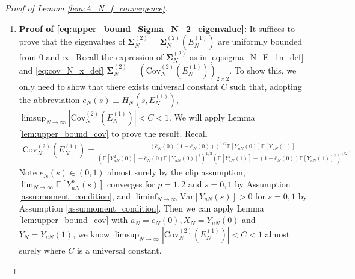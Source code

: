 \documentclass[12pt]{article}
\newcommand{\E}{\mathbb E}								%
\begin{document}
\begin{proof}[Proof of Lemma \ref{lem:A_N_f_convergence}]
	\begin{enumerate}
		\item \textbf{Proof of \eqref{eq:upper_bound_Sigma_N_2_eigenvalue}:} It suffices to prove that the eigenvalues of $\bm \Sigma_{N}^{(2)}=\bm\Sigma_{N}^{(2)}(E_{N}^{(1)})$ are uniformly bounded from $0$ and $\infty$. Recall the expression of $\bm\Sigma_{N}^{(2)}$ as in \eqref{eq:sigma_N_E_1n_def} and \eqref{eq:cov_N_x_def} $\bm \Sigma_{N}^{(2)}= (\mathrm{Cov}_N^{(2)}(E_{N}^{(1)}))_{2\times 2}$. To show this, we only need to show that there exists universal constant $C$ such that, adopting the abbreviation $\bar e_N(s)\equiv H_N(s,E_N^{(1)})$, $\limsup_{N\rightarrow\infty}|\mathrm{Cov}_N^{(2)}(E_N^{(1)})|<C<1$. We will apply Lemma \ref{lem:upper_bound_cov} to prove the result. Recall 
		\small
		\begin{align*}
			\mathrm{Cov}_N^{(2)}(E_N^{(1)})=\frac{(\bar e_N(0)(1- \bar e_N(0)))^{1/2}\E[Y_{uN}(0)]\E[Y_{uN}(1)]}{(\E[Y_{uN}^2(0)]-\bar e_N(0)\E[Y_{uN}(0)]^2)^{1/2}(\E[Y_{uN}^2(1)]-(1- \bar e_N(0))\E[Y_{uN}(1)]^2)^{1/2}}.
		\end{align*}
		\normalsize
		Note $\bar e_N(s)\in (0,1)$ almost surely by the clip assumption, $\lim_{N\rightarrow\infty}\E[Y_{uN}^p(s)]$ converges for $p=1,2$ and $s=0,1$ by Assumption \ref{assu:moment_condition}, and $\liminf_{N\rightarrow\infty}\mathrm{Var}[Y_{uN}(s)]>0$ for $s=0,1$ by Assumption \ref{assu:moment_condition}. Then we can apply Lemma \ref{lem:upper_bound_cov} with $a_N=\bar e_N(0), X_N=Y_{uN}(0)$ and $Y_N=Y_{uN}(1)$, we know $\limsup_{N\rightarrow\infty}|\mathrm{Cov}_N^{(2)}(E_{N}^{(1)})|<C<1$ almost surely where $C$ is a universal constant.
	

\end{enumerate}
\end{proof}
\end{document}
